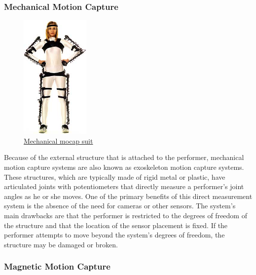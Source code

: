 \pagebreak

\subsubsection*{Mechanical Motion Capture}

\begin{figure}[h]
	\centering
	\includegraphics[width=0.3\textwidth]{figures/background/Mechanical.png}
		\caption{\href{https://metamotion.com/images/gypsy4_standing.jpg}
	{Mechanical mocap suit}}
\end{figure}

Because of the external structure \cite{MOTION CAPTURE TO BUILD A FOUNDATION FOR A COMPUTER-CONTROLLED INSTRUMENT BY STUDY OF CLASSICAL GUITAR PERFORMANCE} that is attached to the performer, mechanical motion capture systems are also known as exoskeleton motion capture systems. These structures, which are typically made of rigid metal or plastic, have articulated joints with potentiometers that directly measure a performer's joint angles as he or she moves. One of the primary benefits of this direct measurement system is the absence of the need for cameras or other sensors. The system's main drawbacks are that the performer is restricted to the degrees of freedom of the structure and that the location of the sensor placement is fixed. If the performer attempts to move beyond the system's degrees of freedom, the structure may be damaged or broken.

\pagebreak

\subsubsection*{Magnetic Motion Capture}


